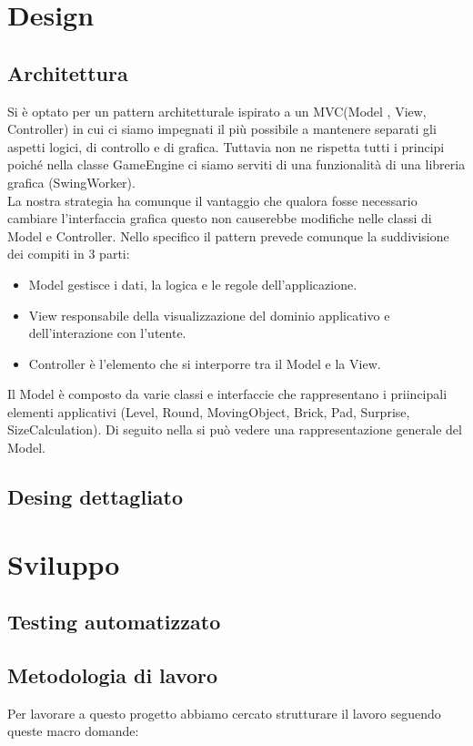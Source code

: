 \documentclass[a4paper,12pt]{report}
\begin{document}
\chapter{Design}
\section{Architettura}
Si è optato per un pattern architetturale ispirato a un MVC(Model , View, Controller) in cui ci siamo impegnati il più
possibile a mantenere separati gli aspetti logici, di controllo e di grafica. Tuttavia non ne rispetta tutti i principi poiché nella classe GameEngine ci siamo
serviti di una funzionalità di una libreria grafica (SwingWorker).
\\La nostra strategia ha comunque il vantaggio che qualora fosse necessario cambiare l'interfaccia grafica
questo non causerebbe modifiche nelle classi di Model e Controller.
Nello specifico il pattern prevede comunque la suddivisione dei compiti in 3 parti:
\begin{itemize}
    \item Model gestisce i dati, la logica e le regole dell'applicazione.
    \item View responsabile della visualizzazione del dominio applicativo e dell'interazione con l'utente.
    \item Controller è l'elemento che si interporre tra il Model e la View.
\end{itemize}
Il Model è composto da varie classi e interfaccie che rappresentano i priincipali elementi applicativi (Level, Round, MovingObject, Brick, Pad, Surprise, SizeCalculation).
Di seguito nella  si può vedere una rappresentazione generale del Model.
\section{Desing dettagliato}
\chapter{Sviluppo}
\section{Testing automatizzato}
\section{Metodologia di lavoro}
Per lavorare
a questo progetto abbiamo cercato strutturare il lavoro seguendo queste macro domande:
\end{document}
